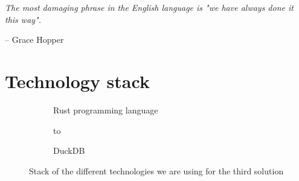 \epigraph{\textit{The most damaging phrase in the English language is "we have always done it this way".}}{-- \textup{Grace Hopper}}

\section{Technology stack}

\begin{figure}[ht]
    \newsavebox\mybox

    \begin{subfigure}{.45\textwidth}
        \centering
        \usebox{\mybox}
        \caption{Rust programming language}
    \end{subfigure}%
    \hspace*{0.5em}
    \begin{subfigure}{.45\textwidth}
        \centering
        \vbox to \ht{}
        \caption{DuckDB}
    \end{subfigure}%
    \caption{Stack of the different technologies we are using for the third solution}
\end{figure}